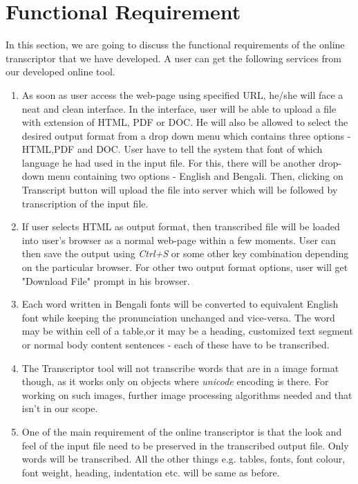 \documentclass[12pt,oneside,openany,a4paper]{book}
\begin{document}
\chapter{Functional Requirement}
\label{functionalrequirement}
In this section, we are going to discuss the functional requirements of the online transcriptor that we have developed. A user can get the following services from our developed online tool.
\begin{enumerate}[label=\roman*)]
\item{
As soon as user access the web-page using specified URL, he/she will face a neat and clean interface. In the interface, user will be able to upload a file with extension of HTML, PDF or DOC. He will also be allowed to select the desired output format from a drop down menu which contains three options - HTML,PDF and DOC. User have to tell the system that font of which language he had used in the input file. For this, there will be another drop-down menu containing two options - English and Bengali. Then, clicking on Transcript button will upload the file into server which will be followed by transcription of the input file.
}
\item{
If user selects HTML as output format, then transcribed file will be loaded into user's browser as a normal web-page within a few moments. User can then save the output using \emph{Ctrl+S} or some other key combination depending on the particular browser. For other two output format options, user will get "Download File" prompt in his browser. 
}
\item{
Each word written in Bengali fonts will be converted to equivalent English font while keeping the pronunciation unchanged and vice-versa. The word may be within cell of a table,or it may be a heading, customized text segment or normal body content sentences - each of these have to be transcribed.  
}
\item{
The Transcriptor tool will not transcribe words that are in a image format though, as it works only on objects where \emph{unicode} encoding is there. For working on such images, further image processing algorithms needed and that isn't in our scope.   
}
\item{
One of the main requirement of the online transcriptor is that the look and feel of the input file need to be preserved in the transcribed output file. Only words will be transcribed. All the other things e.g. tables, fonts, font colour, font weight, heading, indentation  etc. will be same as before.
}
\end{enumerate}
\end{document}

